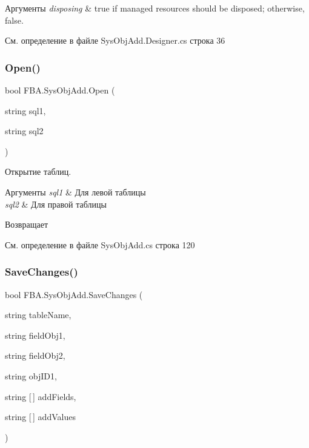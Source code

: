 \begin{DoxyParams}{Аргументы}
{\em disposing} & true if managed resources should be disposed; otherwise, false.\\
\hline
\end{DoxyParams}


См. определение в файле Sys\+Obj\+Add.\+Designer.\+cs строка 36

\mbox{\label{class_f_b_a_1_1_sys_obj_add_a3fd9081c2e6745d80ba5f090fb9fa60f}} 
\subsubsection{\texorpdfstring{Open()}{Open()}}
{\footnotesize\ttfamily bool F\+B\+A.\+Sys\+Obj\+Add.\+Open (\begin{DoxyParamCaption}\item[{string}]{sql1,  }\item[{string}]{sql2 }\end{DoxyParamCaption})}



Открытие таблиц. 


\begin{DoxyParams}{Аргументы}
{\em sql1} & Для левой таблицы\\
\hline
{\em sql2} & Для правой таблицы\\
\hline
\end{DoxyParams}
\begin{DoxyReturn}{Возвращает}

\end{DoxyReturn}


См. определение в файле Sys\+Obj\+Add.\+cs строка 120

\mbox{\label{class_f_b_a_1_1_sys_obj_add_a4d54648c900b7a222d288c86184e22c7}} 
\subsubsection{\texorpdfstring{Save\+Changes()}{SaveChanges()}}
{\footnotesize\ttfamily bool F\+B\+A.\+Sys\+Obj\+Add.\+Save\+Changes (\begin{DoxyParamCaption}\item[{string}]{table\+Name,  }\item[{string}]{field\+Obj1,  }\item[{string}]{field\+Obj2,  }\item[{string}]{obj\+I\+D1,  }\item[{string \mbox{[}$\,$\mbox{]}}]{add\+Fields,  }\item[{string \mbox{[}$\,$\mbox{]}}]{add\+Values }\end{DoxyParamCaption})}



